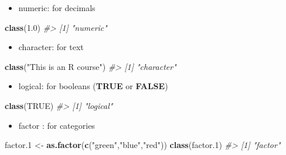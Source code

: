 \documentclass[
]{book}
\newenvironment{Shaded}{\begin{snugshade}}{\end{snugshade}}
\newcommand{\CommentTok}[1]{\textcolor[rgb]{0.56,0.35,0.01}{\textit{#1}}}
\newcommand{\ConstantTok}[1]{\textcolor[rgb]{0.56,0.35,0.01}{#1}}
\newcommand{\FloatTok}[1]{\textcolor[rgb]{0.00,0.00,0.81}{#1}}
\newcommand{\FunctionTok}[1]{\textcolor[rgb]{0.13,0.29,0.53}{\textbf{#1}}}
\newcommand{\NormalTok}[1]{#1}
\newcommand{\OtherTok}[1]{\textcolor[rgb]{0.56,0.35,0.01}{#1}}
\newcommand{\StringTok}[1]{\textcolor[rgb]{0.31,0.60,0.02}{#1}}
\providecommand{\tightlist}{%
  \setlength{\itemsep}{0pt}\setlength{\parskip}{0pt}}
\begin{document}
\begin{itemize}
\tightlist
\item
  numeric: for decimals
\end{itemize}

\begin{Shaded}
\begin{Highlighting}[]
\FunctionTok{class}\NormalTok{(}\FloatTok{1.0}\NormalTok{)}
\CommentTok{\#\textgreater{} [1] "numeric"}
\end{Highlighting}
\end{Shaded}

\begin{itemize}
\tightlist
\item
  character: for text
\end{itemize}

\begin{Shaded}
\begin{Highlighting}[]
\FunctionTok{class}\NormalTok{(}\StringTok{"This is an R course"}\NormalTok{)}
\CommentTok{\#\textgreater{} [1] "character"}
\end{Highlighting}
\end{Shaded}

\begin{itemize}
\tightlist
\item
  logical: for booleans (\textbf{TRUE} or \textbf{FALSE})
\end{itemize}

\begin{Shaded}
\begin{Highlighting}[]
\FunctionTok{class}\NormalTok{(}\ConstantTok{TRUE}\NormalTok{)}
\CommentTok{\#\textgreater{} [1] "logical"}
\end{Highlighting}
\end{Shaded}

\begin{itemize}
\tightlist
\item
  factor : for categories
\end{itemize}

\begin{Shaded}
\begin{Highlighting}[]
\NormalTok{factor}\FloatTok{.1} \OtherTok{\textless{}{-}} \FunctionTok{as.factor}\NormalTok{(}\FunctionTok{c}\NormalTok{(}\StringTok{"green"}\NormalTok{,}\StringTok{"blue"}\NormalTok{,}\StringTok{"red"}\NormalTok{))}
\FunctionTok{class}\NormalTok{(factor}\FloatTok{.1}\NormalTok{)}
\CommentTok{\#\textgreater{} [1] "factor"}
\end{Highlighting}
\end{Shaded}
\end{document}
